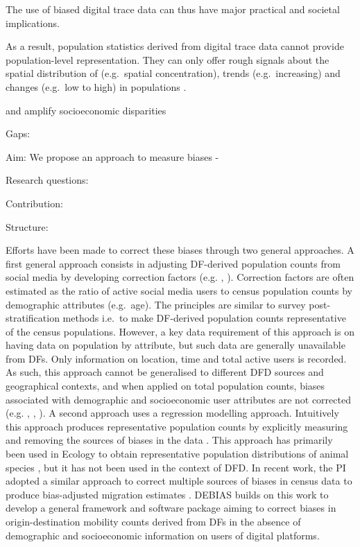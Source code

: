 \documentclass[]{rsos}%
\begin{document}
The use of biased digital trace data can thus have major practical and
societal implications.

As a result, population statistics derived from digital trace data
cannot provide population-level representation. They can only offer
rough signals about the spatial distribution of (e.g.~spatial
concentration), trends (e.g.~increasing) and changes (e.g.~low to high)
in populations \citep{rowe22-sensing-ukraine}.

and amplify socioeconomic disparities

Gaps:

Aim: We propose an approach to measure biases -

Research questions:

Contribution:

Structure:

Efforts have been made to correct these biases through two general
approaches. A first general approach consists in adjusting DF-derived
population counts from social media by developing correction factors
(e.g. \citep{yildiz17-twitter}, \citep{Hsiao24-bias}). Correction factors are
often estimated as the ratio of active social media users to census
population counts by demographic attributes (e.g.~age). The principles
are similar to survey post-stratification methods i.e.~to make
DF-derived population counts representative of the census populations.
However, a key data requirement of this approach is on having data on
population by attribute, but such data are generally unavailable from
DFs. Only information on location, time and total active users is
recorded. As such, this approach cannot be generalised to different DFD
sources and geographical contexts, and when applied on total population
counts, biases associated with demographic and socioeconomic user
attributes are not corrected (e.g. \citep{rodriguez-carrion18-biases},
\citep{schlosser21-biases}, \citep{pak22-correcting-bias}). A second approach uses
a regression modelling approach. Intuitively this approach produces
representative population counts by explicitly measuring and removing
the sources of biases in the data \citep{kramer-schadt13-bias-correction}.
This approach has primarily been used in Ecology to obtain
representative population distributions of animal species
\citep{zizka21-sampbias}, but it has not been used in the context of DFD. In
recent work, the PI adopted a similar approach to correct multiple
sources of biases in census data to produce bias-adjusted migration
estimates \citep{aparicio-castro23-bayesian}. DEBIAS builds on this work to
develop a general framework and software package aiming to correct
biases in origin-destination mobility counts derived from DFs in the
absence of demographic and socioeconomic information on users of digital
platforms.
\end{document}
